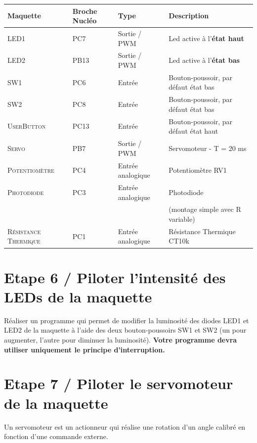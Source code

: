 \documentclass[a4paper,11pt,titlepage]{article} %
\begin{document}
\begin{center}
\begin{tabular}{|l|l|l|l|}
\hline 
Maquette & \textbf{Broche Nucléo} & Type & Description \\ 
\hline 
\textsc{LED1} & PC7 & Sortie / PWM & Led active à l'\textbf{état haut}\\ 
\textsc{LED2} & PB13 & Sortie / PWM & Led active à l'\textbf{état bas}\\ 
\hline 
\textsc{SW1} & PC6 & Entrée & Bouton-poussoir, par défaut état bas\\ 
\textsc{SW2} & PC8 & Entrée & Bouton-poussoir, par défaut état bas\\ 
\textsc{UserButton} & PC13 & Entrée & Bouton-poussoir, par défaut état haut\\
\hline 
\textsc{Servo} & PB7 & Sortie / PWM & Servomoteur - T = 20 ms\\ 
\hline 
\textsc{Potentiomètre} & PC4 & Entrée analogique & Potentiomètre RV1 \\
\hline 
\textsc{Photodiode} & PC3 & Entrée analogique & Photodiode \\
 & & & (montage simple avec R variable)\\ 
\hline 
\textsc{Résistance Thermique} & PC1 & Entrée analogique & Résistance Thermique CT10k\\ 
\hline 
\end{tabular} 
\end{center}


\section{Etape 6 / Piloter l'intensité des LEDs de la maquette}

\Manip Réaliser un programme qui permet de modifier la luminosité des diodes LED1 et LED2 de la maquette à l'aide des deux bouton-poussoirs SW1 et SW2 (un pour augmenter, l'autre pour diminuer la luminosité). \textbf{Votre programme devra utiliser uniquement le principe d'interruption.}

\newpage
\section{Etape 7 / Piloter le servomoteur de la maquette}

Un servomoteur est un actionneur qui réalise une rotation d'un angle calibré en fonction d'une commande externe.
\end{document}
